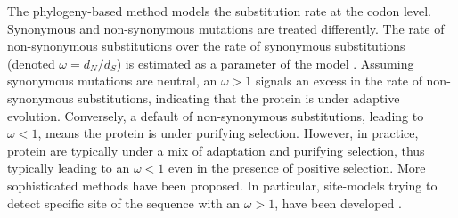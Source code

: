The phylogeny-based method models the \gls{substitution} rate at the \gls{codon} level. Synonymous and non-synonymous mutations are treated differently. The rate of non-synonymous substitutions over the rate of synonymous substitutions (denoted $\omega=d_N/d_S$) is estimated as a parameter of the model \citep{Muse1994,Goldman1994}. Assuming synonymous mutations are \gls{neutral}, an $\omega>1$ signals an excess in the rate of non-synonymous substitutions, indicating that the protein is under adaptive evolution. Conversely, a default of non-synonymous substitutions, leading to $\omega<1$, means the protein is under purifying selection. However, in practice, protein are typically under a mix of adaptation and purifying selection, thus typically leading to an $\omega<1$ even in the presence of positive selection. More sophisticated methods have been proposed. In particular, site-models trying to detect specific site of the sequence with an $\omega>1$, have been developed \citep{Yang2001, kosiol_patterns_2008}.


